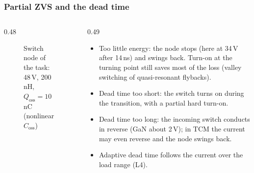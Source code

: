 \begin{frame}
	\frametitle{Partial ZVS and the dead time}
	\begin{columns}[T]
		\begin{column}{0.48\textwidth}
			\begin{figure}
				\centering
				\caption{Switch node of the task: 48\,V, 200\,nH, $Q_\mathrm{oss}=10$\,nC (nonlinear $C_\mathrm{oss}$)}
			\end{figure}
		\end{column}
		\begin{column}{0.49\textwidth}
			\small
			\begin{itemize}
				\item Too little energy: the node stops (here at 34\,V after 14\,ns) and swings back. Turn-on at the turning point still saves most of the loss (valley switching of quasi-resonant flybacks).
				\item Dead time too short: the switch turns on during the transition, with a partial hard turn-on.
				\item Dead time too long: the incoming switch conducts in reverse (GaN about 2\,V); in TCM the current may even reverse and the node swings back.
				\item Adaptive dead time follows the current over the load range (L4).
			\end{itemize}
		\end{column}
	\end{columns}
\end{frame}

